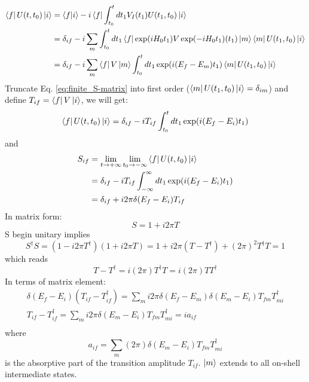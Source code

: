 \begin{equation}
    \begin{aligned}
	\bra{f} U(t, t_0) \ket{i} 
	&= \bra{f}\ket{i} - i \bra{f} \int_{t_0}^t dt_1 V_I(t_1) U(t_1, t_0) \ket{i}	\\
	&= \delta_{if} - i\sum_m \int_{t_0}^t dt_1 \bra{f}\exp(iH_0 t_1) V \exp(-iH_0 t_1)(t_1)\ket{m} \bra{m} U(t_1, t_0) \ket{i} \\
	&= \delta_{if} - i\sum_m \bra{f}V\ket{m} \int_{t_0}^t dt_1 \exp(i(E_f - E_m)t_1) \bra{m}U(t_1, t_0)\ket{i}  \\
    \end{aligned}
    \label{eq:finite_S-matrix}
\end{equation}
Truncate Eq. \ref{eq:finite_S-matrix} into first order ($\bra{m} U(t_1, t_0) \ket{i} = \delta_{im}$)
and define $T_{if} = \bra{f} V \ket{i}$, we will get:
\begin{equation}
    \bra{f} U(t, t_0) \ket{i} = \delta_{if} - iT_{if} \int_{t_0}^t dt_1 \exp(i(E_f - E_i)t_1)
\end{equation}
and 
\begin{equation}
    \begin{aligned}
	S_{if} &= \lim_{t\rightarrow +\infty}\lim_{t_0 \rightarrow -\infty} \bra{f} U(t, t_0) \ket{i}    \\
	    &= \delta_{if} - iT_{if} \int_{-\infty}^{\infty} dt_1 \exp(i(E_f - E_i)t_1)	\\
	    &= \delta_{if} + i2\pi\delta(E_f - E_i)T_{if}   \\
    \end{aligned}
\end{equation}
In matrix form:
\begin{equation}
    S = 1 + i2\pi T
\end{equation}
S begin unitary implies
\begin{equation}
    S^\dag S = (1 - i2\pi T^\dag) (1 + i2\pi T) = 1 + i2\pi(T - T^\dag) + (2\pi)^2 T^\dag T = 1
\end{equation}
which reads
\begin{equation}
    T - T^\dag = i (2\pi)T^\dag T = i(2\pi) T T^\dag
\end{equation}
In terms of matrix element:
\begin{equation}
    \begin{gathered}
    \delta(E_f - E_i)(T_{if} - T^\dag_{if}) = \sum_m i2\pi\delta(E_f - E_m)\delta(E_m - E_i)T_{fm}T^\dag_{mi}	\\
    T_{if} - T^\dag_{if} = \sum_m i2\pi\delta(E_m - E_i)T_{fm}T^\dag_{mi} = ia_{if} \\
    \end{gathered}
\end{equation}
where 
\begin{equation}
    a_{if} = \sum_m (2\pi) \delta(E_m - E_i)T_{fm}T^\dag_{mi}
\end{equation}
is the absorptive part of the transition amplitude $T_{if}$. $\ket{m}$ extends
to all on-shell intermediate states.

